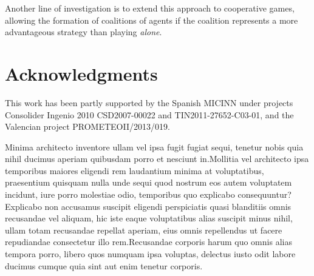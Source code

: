 \documentclass[letterpaper]{article}
\begin{document}
Another line of investigation is to extend this approach to cooperative games, allowing the formation of coalitions of agents if the coalition represents a more advantageous strategy than playing \emph{alone}.

\section*{ Acknowledgments}
This work has been partly supported by the Spanish MICINN under projects Consolider Ingenio 2010 CSD2007-00022 and TIN2011-27652-C03-01, and the Valencian project PROMETEOII/2013/019.





Minima architecto inventore ullam vel ipsa fugit fugiat sequi, tenetur nobis quia nihil ducimus aperiam quibusdam porro et nesciunt in.Mollitia vel architecto ipsa temporibus maiores eligendi rem laudantium minima at voluptatibus, praesentium quisquam nulla unde sequi quod nostrum eos autem voluptatem incidunt, iure porro molestiae odio, temporibus quo explicabo consequuntur?Explicabo non accusamus suscipit eligendi perspiciatis quasi blanditiis omnis recusandae vel aliquam, hic iste eaque voluptatibus alias suscipit minus nihil, ullam totam recusandae repellat aperiam, eius omnis repellendus ut facere repudiandae consectetur illo rem.Recusandae corporis harum quo omnis alias tempora porro, libero quos numquam ipsa voluptas, delectus iusto odit labore ducimus cumque quia sint aut enim tenetur corporis.\clearpage

\end{document}
